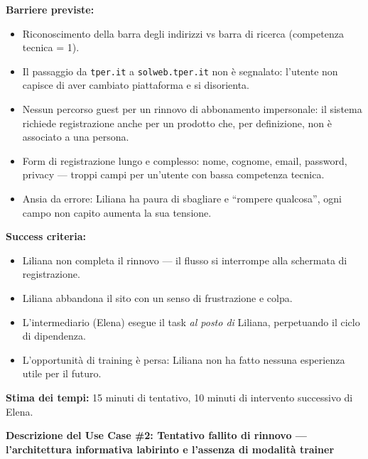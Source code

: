 \documentclass[11pt,a4paper]{article}
\begin{document}
\begin{tcolorbox}[colback=backgroundColor,colframe=borderColor,arc=2mm]
{    \textbf{Barriere previste:}
    \begin{itemize}
        \item Riconoscimento della barra degli indirizzi vs barra di ricerca (competenza tecnica = 1).
        \item Il passaggio da \texttt{tper.it} a \texttt{solweb.tper.it} non è segnalato: l'utente non capisce di aver cambiato piattaforma e si disorienta.
        \item Nessun percorso guest per un rinnovo di abbonamento impersonale: il sistema richiede registrazione anche per un prodotto che, per definizione, non è associato a una persona.
        \item Form di registrazione lungo e complesso: nome, cognome, email, password, privacy --- troppi campi per un'utente con bassa competenza tecnica.
        \item Ansia da errore: Liliana ha paura di sbagliare e ``rompere qualcosa'', ogni campo non capito aumenta la sua tensione.
    \end{itemize}

    \textbf{Success criteria:}
    \begin{itemize}
        \item Liliana non completa il rinnovo --- il flusso si interrompe alla schermata di registrazione.
        \item Liliana abbandona il sito con un senso di frustrazione e colpa.
        \item L'intermediario (Elena) esegue il task \textit{al posto di} Liliana, perpetuando il ciclo di dipendenza.
        \item L'opportunità di training è persa: Liliana non ha fatto nessuna esperienza utile per il futuro.
    \end{itemize}

    \textbf{Stima dei tempi:} 15 minuti di tentativo, 10 minuti di intervento successivo di Elena.
    }
\end{tcolorbox}

\newpage


\begin{tcolorbox}[colback=primaryColor!10,colframe=primaryColor,arc=2mm]
    \textbf{Descrizione del Use Case \#2: Tentativo fallito di rinnovo --- l'architettura informativa labirinto e l'assenza di modalità trainer}
\end{tcolorbox}
\end{document}
